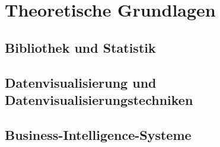 \chapter{Theoretische Grundlagen}

\section{Bibliothek und Statistik}
\section{Datenvisualisierung und Datenvisualisierungstechniken}
\section{Business-Intelligence-Systeme}